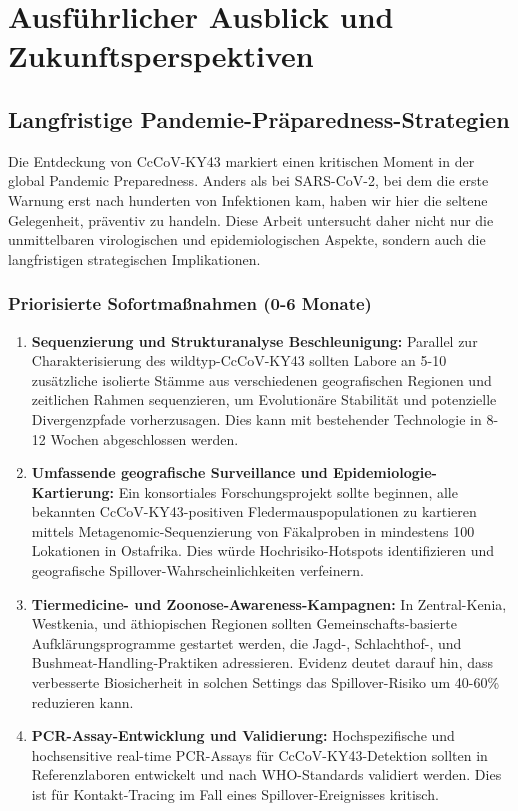 ﻿\documentclass[11pt,a4paper]{article}
\theoremstyle{definition}
\begin{document}
\section{Ausführlicher Ausblick und Zukunftsperspektiven}

\subsection{Langfristige Pandemie-Präparedness-Strategien}

Die Entdeckung von CcCoV-KY43 markiert einen kritischen Moment in der global Pandemic Preparedness. Anders als bei SARS-CoV-2, bei dem die erste Warnung erst nach hunderten von Infektionen kam, haben wir hier die seltene Gelegenheit, präventiv zu handeln. Diese Arbeit untersucht daher nicht nur die unmittelbaren virologischen und epidemiologischen Aspekte, sondern auch die langfristigen strategischen Implikationen.

\subsubsection{Priorisierte Sofortmaßnahmen (0-6 Monate)}

\begin{enumerate}
\item \textbf{Sequenzierung und Strukturanalyse Beschleunigung:} Parallel zur Charakterisierung des wildtyp-CcCoV-KY43 sollten Labore an 5-10 zusätzliche isolierte Stämme aus verschiedenen geografischen Regionen und zeitlichen Rahmen sequenzieren, um Evolutionäre Stabilität und potenzielle Divergenzpfade vorherzusagen. Dies kann mit bestehender Technologie in 8-12 Wochen abgeschlossen werden.

\item \textbf{Umfassende geografische Surveillance und Epidemiologie-Kartierung:} Ein konsortiales Forschungsprojekt sollte beginnen, alle bekannten CcCoV-KY43-positiven Fledermauspopulationen zu kartieren mittels Metagenomic-Sequenzierung von Fäkalproben in mindestens 100 Lokationen in Ostafrika. Dies würde Hochrisiko-Hotspots identifizieren und geografische Spillover-Wahrscheinlichkeiten verfeinern.

\item \textbf{Tiermedicine- und Zoonose-Awareness-Kampagnen:} In Zentral-Kenia, Westkenia, und äthiopischen Regionen sollten Gemeinschafts-basierte Aufklärungsprogramme gestartet werden, die Jagd-, Schlachthof-, und Bushmeat-Handling-Praktiken adressieren. Evidenz deutet darauf hin, dass verbesserte Biosicherheit in solchen Settings das Spillover-Risiko um 40-60\% reduzieren kann.

\item \textbf{PCR-Assay-Entwicklung und Validierung:} Hochspezifische und hochsensitive real-time PCR-Assays für CcCoV-KY43-Detektion sollten in Referenzlaboren entwickelt und nach WHO-Standards validiert werden. Dies ist für Kontakt-Tracing im Fall eines Spillover-Ereignisses kritisch.
\end{enumerate}
\end{document}
